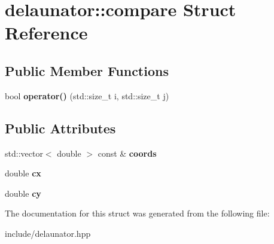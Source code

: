 \hypertarget{structdelaunator_1_1compare}{}\section{delaunator\+:\+:compare Struct Reference}
\label{structdelaunator_1_1compare}
\subsection*{Public Member Functions}
\begin{DoxyCompactItemize}
\item 
\mbox{\label{structdelaunator_1_1compare_a78b94657ec7bad085353f318365fa20a}} 
bool {\bfseries operator()} (std\+::size\+\_\+t i, std\+::size\+\_\+t j)
\end{DoxyCompactItemize}
\subsection*{Public Attributes}
\begin{DoxyCompactItemize}
\item 
\mbox{\label{structdelaunator_1_1compare_a28fe3e7cd51ef236ac051fb47421321a}} 
std\+::vector$<$ double $>$ const  \& {\bfseries coords}
\item 
\mbox{\label{structdelaunator_1_1compare_a71238f2868c76ee8048cdd72d58da65c}} 
double {\bfseries cx}
\item 
\mbox{\label{structdelaunator_1_1compare_ad8f7ce42823fff74a6062e439f93682d}} 
double {\bfseries cy}
\end{DoxyCompactItemize}


The documentation for this struct was generated from the following file\+:\begin{DoxyCompactItemize}
\item 
include/delaunator.\+hpp\end{DoxyCompactItemize}
